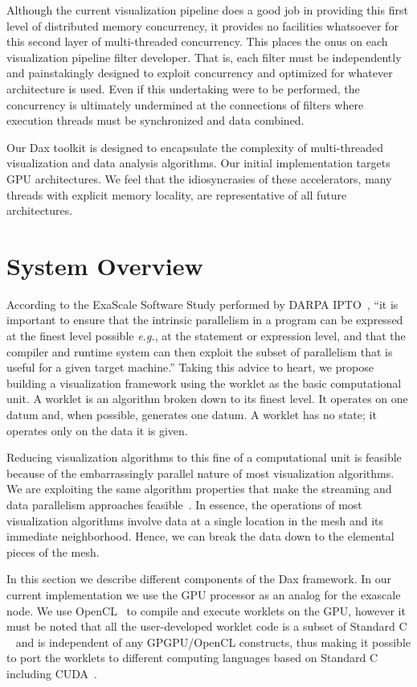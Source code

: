 \documentclass{vgtc}                          %
\newcommand*{\lcite}[1]{~\cite{#1}}
\begin{document}
Although the current visualization pipeline does a good job in providing
this first level of distributed memory concurrency, it provides no
facilities whatsoever for this second layer of multi-threaded concurrency.
This places the onus on each visualization pipeline filter developer.  That
is, each filter must be independently and painstakingly designed to exploit
concurrency and optimized for whatever architecture is used.  Even if this
undertaking were to be performed, the concurrency is ultimately undermined
at the connections of filters where execution threads must be synchronized
and data combined.

Our Dax toolkit is designed to encapsulate the complexity of multi-threaded
visualization and data analysis algorithms.  Our initial implementation
targets GPU architectures.  We feel that the idiosyncrasies of these
accelerators, many threads with explicit memory locality, are
representative of all future architectures.

\section{System Overview}
\label{sec:SystemOverview}

According to the ExaScale Software Study performed by DARPA
IPTO\lcite{DARPAExascaleStudy}, ``it is important to ensure that the
intrinsic parallelism in a program can be expressed at the finest level
possible \emph{e.g.}, at the statement or expression level, and that the
compiler and runtime system can then exploit the subset of parallelism that
is useful for a given target machine.''  Taking this advice to heart, we
propose building a visualization framework using the worklet as the basic
computational unit.  A worklet is an algorithm broken down to its finest
level.  It operates on one datum and, when possible, generates one datum.
A worklet has no state; it operates only on the data it is given.

Reducing visualization algorithms to this fine of a computational unit is
feasible because of the embarrassingly parallel nature of most
visualization algorithms.  We are exploiting the same algorithm properties
that make the streaming and data parallelism approaches
feasible\lcite{Ahrens00,Ahrens01}.  In essence, the operations of most
visualization algorithms involve data at a single location in the mesh and
its immediate neighborhood.  Hence, we can break the data down to the
elemental pieces of the mesh. 

In this section we describe different components of the Dax framework. In our
current implementation we use the GPU processor as an analog for the exascale
node. We use OpenCL\lcite{OpenCL} to compile and execute worklets on the GPU, however it must
be noted that all the user-developed worklet code is a subset of Standard C
\lcite{ANSIC} and
is independent of any GPGPU/OpenCL constructs, thus making it possible to port
the worklets to different computing languages based on Standard C including CUDA\lcite{CUDA}.
\end{document}
